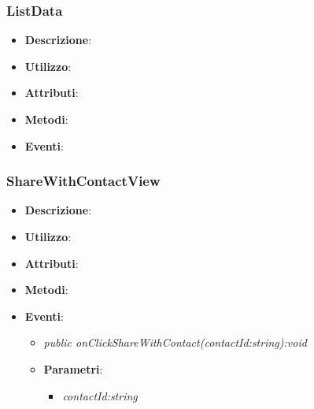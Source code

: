\subsubsection{ListData}
\begin{itemize}
\item \textbf{Descrizione}: 
\item \textbf{Utilizzo}:
\item \textbf{Attributi}: 
\item \textbf{Metodi}:
\item \textbf{Eventi}:
\end{itemize}

\subsubsection{ShareWithContactView}
\begin{itemize}
\item \textbf{Descrizione}: 
\item \textbf{Utilizzo}:
\item \textbf{Attributi}: 
\item \textbf{Metodi}:
\item \textbf{Eventi}:
\begin{itemize}
\item \textit{public onClickShareWithContact(contactId:string):void}\\

	\item{\textbf{Parametri}: \begin{itemize}
	\item \textit{contactId:string}\\
	
	\end{itemize}}
\end{itemize}
\end{itemize}

